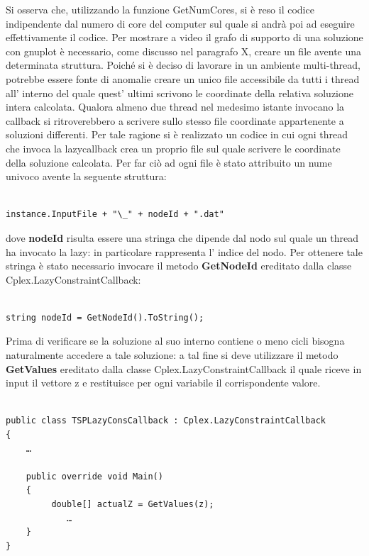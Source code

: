 \documentclass[11pt]{article}
\begin{document}
Si osserva che, utilizzando la funzione GetNumCores, si è reso il codice indipendente dal numero di core del computer sul quale si andrà poi ad eseguire effettivamente il codice.
Per mostrare a video il grafo di supporto di una soluzione con gnuplot è necessario, come discusso nel paragrafo X,  creare un file avente una determinata struttura. Poiché si è deciso di lavorare in un ambiente multi-thread, potrebbe essere fonte di anomalie creare un unico file accessibile da tutti i thread all' interno del quale quest' ultimi scrivono le coordinate della relativa soluzione intera calcolata.  Qualora almeno due thread nel medesimo istante invocano la callback si ritroverebbero a scrivere sullo stesso file coordinate appartenente a soluzioni differenti. 
Per tale ragione si è realizzato un codice in cui ogni thread che invoca la lazycallback crea un proprio file sul quale scrivere le coordinate della soluzione calcolata. Per far ciò ad ogni file è stato attribuito un nume univoco avente la seguente struttura:


\begin{lstlisting}

instance.InputFile + "\_" + nodeId + ".dat"

\end{lstlisting}


dove \textbf{nodeId} risulta essere una stringa che dipende dal nodo sul quale un thread ha invocato la lazy: in particolare rappresenta l' indice del nodo. Per ottenere tale stringa è stato necessario invocare il metodo \textbf{GetNodeId} ereditato dalla classe Cplex.LazyConstraintCallback:


\begin{lstlisting}

string nodeId = GetNodeId().ToString();

\end{lstlisting}

Prima di verificare se la soluzione al suo interno contiene o meno cicli bisogna naturalmente accedere a tale soluzione: a tal fine si deve utilizzare il metodo \textbf{GetValues} ereditato dalla classe Cplex.LazyConstraintCallback il quale riceve in input il vettore z e restituisce per ogni variabile il corrispondente valore.


\begin{lstlisting}

public class TSPLazyConsCallback : Cplex.LazyConstraintCallback
{
	…

	public override void Main()
	{
         double[] actualZ = GetValues(z);
    		…
	}
}


\end{lstlisting}
\end{document}
